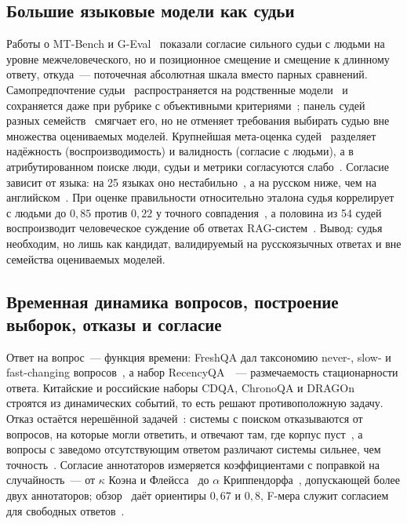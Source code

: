 \documentclass{article}
\begin{document}
\subsection{Большие языковые модели как судьи}

Работы о MT-Bench и G-Eval~\cite{zheng2023judging,liu2023geval} показали согласие сильного судьи с людьми на уровне межчеловеческого, но и позиционное смещение и смещение к длинному ответу, откуда~--- поточечная абсолютная шкала вместо парных сравнений. Самопредпочтение судьи~\cite{panickssery2024selfpreference} распространяется на родственные модели~\cite{li2025preference} и сохраняется даже при рубрике с объективными критериями~\cite{pombal2026selfpreference}; панель судей разных семейств~\cite{verga2024replacing} смягчает его, но не отменяет требования выбирать судью вне множества оцениваемых моделей. Крупнейшая мета-оценка судей~\cite{norman2026reliability} разделяет надёжность (воспроизводимость) и валидность (согласие с людьми), а в атрибутированном поиске люди, судьи и метрики согласуются слабо~\cite{gienapp2026humans}. Согласие зависит от языка: на 25 языках оно нестабильно~\cite{fu2025multilingual}, а на русском ниже, чем на английском~\cite{pugachev2025repa}. При оценке правильности относительно эталона судья коррелирует с людьми до $0{,}85$ против $0{,}22$ у точного совпадения~\cite{ho2025reassessing}, а половина из 54 судей воспроизводит человеческое суждение об ответах RAG-систем~\cite{han2025verdict}. Вывод: судья необходим, но лишь как кандидат, валидируемый на русскоязычных ответах и вне семейства оцениваемых моделей.

\subsection{Временная динамика вопросов, построение выборок, отказы и согласие}

Ответ на вопрос~--- функция времени: FreshQA дал таксономию never-, slow- и fast-changing вопросов~\cite{vu2023freshllms}, а набор RecencyQA~\cite{piryani2026recency}~--- размечаемость стационарности ответа. Китайские и российские наборы CDQA, ChronoQA и DRAGOn~\cite{xu2024cdqa,chen2025chronoqa,chernogorskii2025dragon} строятся из динамических событий, то есть решают противоположную задачу. Отказ остаётся нерешённой задачей~\cite{kirichenko2025abstentionbench}: системы с поиском отказываются от вопросов, на которые могли ответить, и отвечают там, где корпус пуст~\cite{zhou2025ralm,liu2025crumq}, а вопросы с заведомо отсутствующим ответом различают системы сильнее, чем точность~\cite{dorosario2026penalty}. Согласие аннотаторов измеряется коэффициентами с поправкой на случайность~--- от $\kappa$ Коэна и Флейсса~\cite{cohen1960coefficient,fleiss1971measuring} до $\alpha$ Криппендорфа~\cite{krippendorff1970estimating}, допускающей более двух аннотаторов; обзор~\cite{artstein2008intercoder} даёт ориентиры $0{,}67$ и $0{,}8$, F-мера служит согласием для свободных ответов~\cite{hripcsak2005agreement}.
\end{document}
